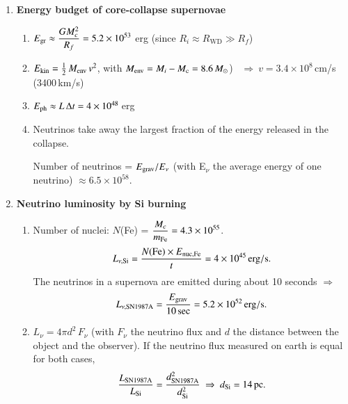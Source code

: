 \documentclass[11pt,a4paper,fleqn]{report}
\begin{document}

\begin{enumerate}


\item {\bf Energy budget of core-collapse supernovae}

  \begin{enumerate}

  \item $E_{\rm gr} \approx \displaystyle \frac{G M_c^2}{R_f} = 5.2
    \times 10^{53}$ erg \quad (since $R_i \approx R_\mathrm{WD} \gg R_f$)

  \item $E_{\rm kin} = \frac{1}{2}\, M_{\rm env}\, v^2$, \quad with
    $M_{\rm env} = M_i - M_{\rm c} = 8.6\,{M}_\odot$) ~$\Rightarrow~ v =
    3.4\times 10^8$\,cm/s (3400\,km/s)

  \item $E_{\rm ph} \approx L\, \Delta t = 4\times 10^{48}$\,erg

  \item Neutrinos take away the largest fraction of the energy
    released in the collapse.

    Number of neutrinos = $E_{\rm grav}/E_{\nu}$ (with E$_{\nu}$ the
    average energy of one neutrino) $\approx 6.5 \times 10^{58}$.

\end{enumerate} 


\item {\bf Neutrino luminosity by Si burning}

  \begin{enumerate}


  \item Number of  nuclei: $N$(Fe) = $\displaystyle
    \frac{M_{c}}{m_{\rm Fe}} = 4.3\times 10^{55}$.
    \[
    L_{\nu,\mathrm{Si}} = \frac{N(\mathrm{Fe}) \times 
      E_{\rm nuc,\mathrm{Fe}}}{t} = 4 \times 10^{45}\, \rm erg/s.
    \]
    The neutrinos in a supernova are emitted during about 10 seconds
    $\Rightarrow$
    \[
    L_{\nu,\mathrm{SN1987A}} = \frac{E_{\rm grav}}{10\,\mathrm{sec}} 
    = 5.2 \times 10^{52}\, \rm erg/s.
    \]

  \item $L_\nu = 4\pi d^2\, F_\nu$ (with $F_\nu$ the neutrino flux and
    $d$ the distance between the object and the observer).
    If the neutrino flux measured on earth is equal for both cases,
    \[
    \frac{L_{\rm SN1987A}}{L_{\rm Si}} = 
    \frac{d^2_{\rm SN1987A}}{d^2_{\rm Si}} ~\Rightarrow~ 
    d_{\rm Si} = 14\,\mathrm{pc}.
    \] 


\end{enumerate}
\end{enumerate}
\end{document}
